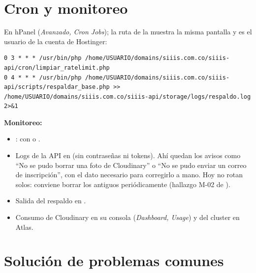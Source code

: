 \documentclass[11pt,a4paper]{article}
\begin{document}
\section{Cron y monitoreo}\label{sec:cron}

En hPanel (\emph{Avanzado, Cron Jobs}); la ruta de  la muestra la misma pantalla y  es el usuario
de la cuenta de Hostinger:
\begin{lstlisting}[style=texto]
0 3 * * * /usr/bin/php /home/USUARIO/domains/siiis.com.co/siiis-api/cron/limpiar_ratelimit.php
0 4 * * * /usr/bin/php /home/USUARIO/domains/siiis.com.co/siiis-api/scripts/respaldar_base.php >> /home/USUARIO/domains/siiis.com.co/siiis-api/storage/logs/respaldo.log 2>&1
\end{lstlisting}

\textbf{Monitoreo:}
\begin{itemize}
  \item {}:  con  o .
  \item Logs de la API en  (sin contrase\~nas ni tokens). Ah\'i quedan los avisos
    como ``No se pudo borrar una foto de Cloudinary'' o ``No se pudo enviar un correo de inscripci\'on'', con el dato
    necesario para corregirlo a mano. Hoy no rotan solos: conviene borrar los antiguos peri\'odicamente (hallazgo M-02
    de ).
  \item Salida del respaldo en .
  \item Consumo de Cloudinary en su consola (\emph{Dashboard, Usage}) y del cluster en Atlas.
\end{itemize}

\section{Soluci\'on de problemas comunes}\label{sec:problemas}
\end{document}

